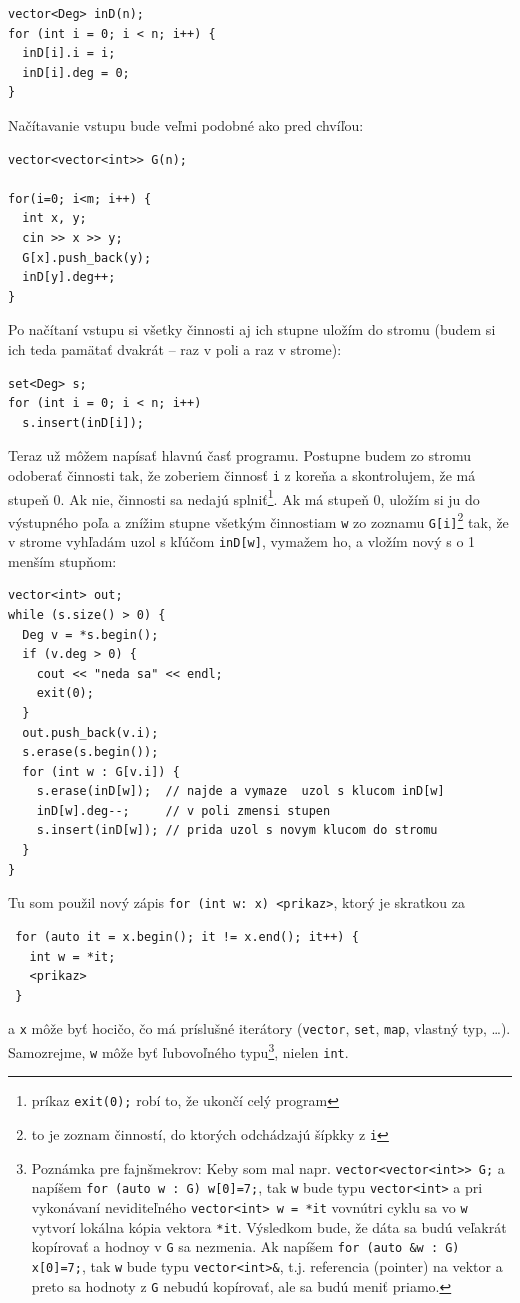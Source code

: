 \documentclass[10pt]{article}
\def\prg{\lstinline}
\def\ods{\vspace*{10pt}}
\begin{document}
{\begin{lstlisting}
vector<Deg> inD(n);
for (int i = 0; i < n; i++) {
  inD[i].i = i;
  inD[i].deg = 0;
}
\end{lstlisting}

Načítavanie vstupu bude veľmi podobné ako pred chvíľou:

\begin{lstlisting}
vector<vector<int>> G(n);

for(i=0; i<m; i++) {
  int x, y;
  cin >> x >> y;
  G[x].push_back(y);
  inD[y].deg++;
}
\end{lstlisting}


Po načítaní vstupu si všetky činnosti aj ich stupne
uložím do stromu (budem si ich teda pamätať dvakrát -- raz v poli a raz v strome):

\begin{lstlisting}
set<Deg> s;
for (int i = 0; i < n; i++) 
  s.insert(inD[i]);
\end{lstlisting}

Teraz už môžem napísať hlavnú časť programu. Postupne budem zo stromu odoberať činnosti
tak, že zoberiem činnosť {\tt i}
z koreňa a skontrolujem, že má stupeň 0. Ak nie, činnosti 
sa nedajú splniť\footnote{príkaz \prg!exit(0);! robí to, že ukončí celý program}.
Ak má stupeň 0, uložím si ju do výstupného poľa a znížim stupne všetkým činnostiam
\prg!w! zo zoznamu \prg!G[i]!\footnote{to je zoznam činností, do ktorých odchádzajú 
šípkky z {\tt i}} tak, že v strome vyhľadám uzol s kľúčom \prg!inD[w]!,
vymažem ho, a vložím nový s o 1 menším stupňom:

\begin{lstlisting}
vector<int> out;
while (s.size() > 0) {
  Deg v = *s.begin();
  if (v.deg > 0) {
    cout << "neda sa" << endl;
    exit(0);
  }
  out.push_back(v.i);
  s.erase(s.begin());
  for (int w : G[v.i]) {
    s.erase(inD[w]);  // najde a vymaze  uzol s klucom inD[w] 
    inD[w].deg--;     // v poli zmensi stupen
    s.insert(inD[w]); // prida uzol s novym klucom do stromu
  }
}
\end{lstlisting}

\ods
Tu som použil nový zápis \prg!for (int w: x) <prikaz>!, ktorý je skratkou za
\begin{lstlisting}
 for (auto it = x.begin(); it != x.end(); it++) {
   int w = *it;
   <prikaz>
 }
\end{lstlisting}
a {\tt x} môže byť hocičo, čo má príslušné iterátory (\prg!vector!, \prg!set!,
\prg!map!, vlastný typ, \ldots). Samozrejme, {\tt w} môže byť
ľubovoľného typu\footnote{%
  Poznámka pre fajnšmekrov: Keby som mal napr. \prg!vector<vector<int>> G;!
  a napíšem \prg!for (auto w : G) w[0]=7;!, tak \prg!w! bude typu \prg!vector<int>!
  a pri vykonávaní neviditeľného \prg!vector<int> w = *it! vovnútri cyklu
  sa vo {\tt w} 
  vytvorí lokálna kópia vektora \prg!*it!.
  Výsledkom bude, že dáta sa budú veľakrát kopírovať a hodnoy v {\tt G} sa nezmenia.
  Ak napíšem \prg!for (auto &w : G) x[0]=7;!, tak {\tt w} bude typu \prg!vector<int>&!,
  t.j. referencia (pointer) na vektor a preto sa hodnoty z {\tt G} nebudú kopírovať,
  ale sa budú meniť priamo.
}, nielen \prg!int!. 


}
\end{document}
